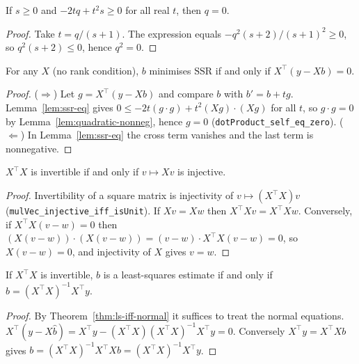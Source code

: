 \begin{lemma}
\label{lem:quadratic-nonneg}
\leanok
If $s \ge 0$ and $-2tq + t^2 s \ge 0$ for all real $t$, then $q = 0$.
\end{lemma}
\begin{proof}
\leanok
Take $t = q/(s+1)$. The expression equals $-q^2(s+2)/(s+1)^2 \ge 0$, so $q^2(s+2) \le 0$, hence $q^2 = 0$.
\end{proof}

\begin{theorem}
\label{thm:ls-iff-normal}
\leanok
{}
For any $X$ (no rank condition), $b$ minimises $\mathrm{SSR}$ if and only if $X^\top(y - Xb) = 0$.
\end{theorem}
\begin{proof}
\leanok
{}
($\Rightarrow$) Let $g = X^\top(y - Xb)$ and compare $b$ with $b' = b + tg$. Lemma~\ref{lem:ssr-eq} gives
$0 \le -2t(g\cdot g) + t^2 (Xg)\cdot(Xg)$ for all $t$, so $g \cdot g = 0$ by
Lemma~\ref{lem:quadratic-nonneg}, hence $g = 0$ (\texttt{dotProduct\_self\_eq\_zero}).
($\Leftarrow$) In Lemma~\ref{lem:ssr-eq} the cross term vanishes and the last term is nonnegative.
\end{proof}

\begin{theorem}
\label{thm:gram-rank}
\leanok
$X^\top X$ is invertible if and only if $v \mapsto Xv$ is injective.
\end{theorem}
\begin{proof}
\leanok
Invertibility of a square matrix is injectivity of $v \mapsto (X^\top X) v$
(\texttt{mulVec\_injective\_iff\_isUnit}). If $Xv = Xw$ then $X^\top X v = X^\top X w$. Conversely, if
$X^\top X(v - w) = 0$ then $(X(v-w))\cdot(X(v-w)) = (v-w)\cdot X^\top X (v-w) = 0$, so $X(v-w) = 0$,
and injectivity of $X$ gives $v = w$.
\end{proof}

\begin{theorem}
\label{thm:ols}
\leanok
{}
If $X^\top X$ is invertible, $b$ is a least-squares estimate if and only if $b = (X^\top X)^{-1}X^\top y$.
\end{theorem}
\begin{proof}
\leanok
{}
By Theorem~\ref{thm:ls-iff-normal} it suffices to treat the normal equations.
$X^\top(y - X\hat b) = X^\top y - (X^\top X)(X^\top X)^{-1} X^\top y = 0$. Conversely
$X^\top y = X^\top X b$ gives $b = (X^\top X)^{-1} X^\top X b = (X^\top X)^{-1}X^\top y$.
\end{proof}

